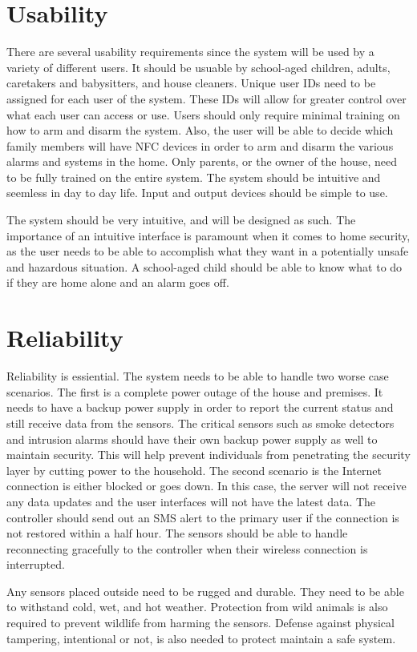 \documentclass{report}
\begin{document}
\section{Usability}
There are several usability requirements since the system will be used by a
variety of different users. It should be usuable by school-aged children,
adults, caretakers and babysitters, and house cleaners. Unique user IDs need to
be assigned for each user of the system. These IDs will allow for greater
control over what each user can access or use. Users should only require
minimal training on how to arm and disarm the system. Also, the user will be able 
to decide which family members will have NFC devices in order to arm and disarm 
the various alarms and systems in the home.  Only parents, or the owner of the 
house, need to be fully trained on the entire system. The system should be 
intuitive and seemless in day to day life. Input and output devices should be 
simple to use.

The system should be very intuitive, and will be designed as such. The
importance of an intuitive interface is paramount when it comes to home
security, as the user needs to be able to accomplish what they want in a
potentially unsafe and hazardous situation. A school-aged child should be able to
know what to do if they are home alone and an alarm goes off.

\section{Reliability}
Reliability is essiential. The system needs to be able to handle two worse case
scenarios. The first is a complete power outage of the house and premises. It
needs to have a backup power supply in order to report the current status and
still receive data from the sensors. The critical sensors such as smoke
detectors and intrusion alarms should have their own backup power supply as
well to maintain security. This will help prevent individuals from penetrating
the security layer by cutting power to the household. The second scenario is
the Internet connection is either blocked or goes down. In this case, the
server will not receive any data updates and the user interfaces will not have
the latest data. The controller should send out an SMS alert to the primary
user if the connection is not restored within a half hour. The sensors should
be able to handle reconnecting gracefully to the controller when their wireless
connection is interrupted.

Any sensors placed outside need to be rugged and durable. They need to be able
to withstand cold, wet, and hot weather. Protection from wild animals is also
required to prevent wildlife from harming the sensors. Defense against physical
tampering, intentional or not, is also needed to protect maintain a safe
system.
\end{document}
